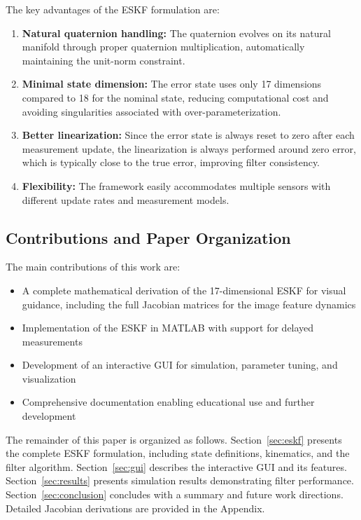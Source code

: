 \documentclass[11pt,a4paper]{article}
\begin{document}
The key advantages of the ESKF formulation are:
\begin{enumerate}
    \item \textbf{Natural quaternion handling:} The quaternion evolves on its natural manifold through proper quaternion multiplication, automatically maintaining the unit-norm constraint.
    \item \textbf{Minimal state dimension:} The error state uses only 17 dimensions compared to 18 for the nominal state, reducing computational cost and avoiding singularities associated with over-parameterization.
    \item \textbf{Better linearization:} Since the error state is always reset to zero after each measurement update, the linearization is always performed around zero error, which is typically close to the true error, improving filter consistency.
    \item \textbf{Flexibility:} The framework easily accommodates multiple sensors with different update rates and measurement models.
\end{enumerate}

\subsection{Contributions and Paper Organization}

The main contributions of this work are:
\begin{itemize}
    \item A complete mathematical derivation of the 17-dimensional ESKF for visual guidance, including the full Jacobian matrices for the image feature dynamics
    \item Implementation of the ESKF in MATLAB with support for delayed measurements
    \item Development of an interactive GUI for simulation, parameter tuning, and visualization
    \item Comprehensive documentation enabling educational use and further development
\end{itemize}

The remainder of this paper is organized as follows. Section~\ref{sec:eskf} presents the complete ESKF formulation, including state definitions, kinematics, and the filter algorithm. Section~\ref{sec:gui} describes the interactive GUI and its features. Section~\ref{sec:results} presents simulation results demonstrating filter performance. Section~\ref{sec:conclusion} concludes with a summary and future work directions. Detailed Jacobian derivations are provided in the Appendix.
\end{document}
